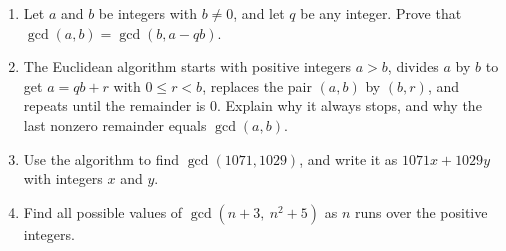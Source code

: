 \begin{enumerate}
\item[(a)] Let $a$ and $b$ be integers with $b\ne0$, and let $q$ be any integer. Prove that $\gcd(a,b)=\gcd(b,a-qb)$.
\item[(b)] The Euclidean algorithm starts with positive integers $a>b$, divides $a$ by $b$ to get $a=qb+r$ with $0\le r<b$, replaces the pair $(a,b)$ by $(b,r)$, and repeats until the remainder is $0$. Explain why it always stops, and why the last nonzero remainder equals $\gcd(a,b)$.
\item[(c)] Use the algorithm to find $\gcd(1071,1029)$, and write it as $1071x+1029y$ with integers $x$ and $y$.
\item[(d)] Find all possible values of $\gcd\left(n+3,\ n^2+5\right)$ as $n$ runs over the positive integers.
\end{enumerate}
